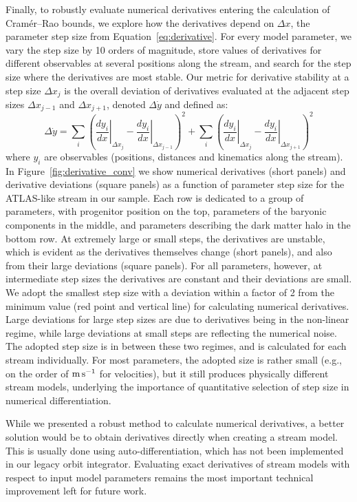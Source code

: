 \documentclass[modern]{aastex61}
\begin{document}
Finally, to robustly evaluate numerical derivatives entering the calculation of Cram\' er--Rao bounds, we explore how the derivatives depend on $\Delta x$, the parameter step size from Equation~\ref{eq:derivative}.
For every model parameter, we vary the step size by 10 orders of magnitude, store values of derivatives for different observables at several positions along the stream, and search for the step size where the derivatives are most stable.
Our metric for derivative stability at a step size $\Delta x_j$ is the overall deviation of derivatives evaluated at the adjacent step sizes $\Delta x_{j-1}$ and $\Delta x_{j+1}$, denoted $\Delta \dot{y}$ and defined as:
\begin{equation}
\Delta \dot{y} = \sum_i \left(\left.\frac{dy_i}{dx}\right\vert_{\Delta x_j} - \left.\frac{dy_i}{dx}\right\vert_{\Delta x_{j-1}}\right)^2 + \sum_i \left(\left.\frac{dy_i}{dx}\right\vert_{\Delta x_j} - \left.\frac{dy_i}{dx}\right\vert_{\Delta x_{j+1}}\right)^2
\label{eq:stability}
\end{equation}
where $y_i$ are observables (positions, distances and kinematics along the stream).
In Figure~\ref{fig:derivative_conv} we show numerical derivatives (short panels) and derivative deviations (square panels) as a function of parameter step size for the ATLAS-like stream in our sample.
Each row is dedicated to a group of parameters, with progenitor position on the top, parameters of the baryonic components in the middle, and parameters describing the dark matter halo in the bottom row.
At extremely large or small steps, the derivatives are unstable, which is evident as the derivatives themselves change (short panels), and also from their large deviations (square panels).
For all parameters, however, at intermediate step sizes the derivatives are constant and their deviations are small.
We adopt the smallest step size with a deviation within a factor of 2 from the minimum value (red point and vertical line) for calculating numerical derivatives.
Large deviations for large step sizes are due to derivatives being in the non-linear regime, while large deviations at small steps are reflecting the numerical noise.
The adopted step size is in between these two regimes, and is calculated for each stream individually.
For most parameters, the adopted size is rather small (e.g., on the order of $\rm m\,s^{-1}$ for velocities), but it still produces physically different stream models, underlying the importance of quantitative selection of step size in numerical differentiation.

While we presented a robust method to calculate numerical derivatives, a better solution would be to obtain derivatives directly when creating a stream model.
This is usually done using auto-differentiation, which has not been implemented in our legacy orbit integrator.
Evaluating exact derivatives of stream models with respect to input model parameters remains the most important technical improvement left for future work.
\end{document}
